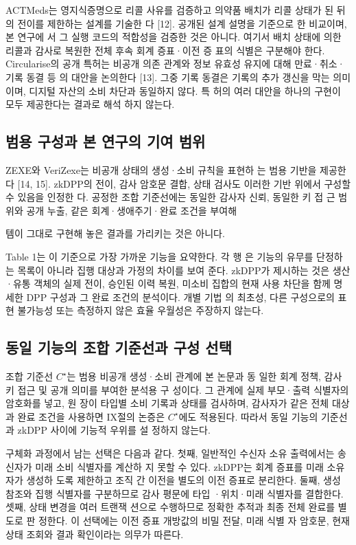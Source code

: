 ACTMeds는 영지식증명으로 리콜 사유를 검증하고 의약품
배치가 리콜 상태가 된 뒤의 전이를 제한하는 설계를 기술한
다 [12]. 공개된 설계 설명을 기준으로 한 비교이며, 본 연구에
서 그 실행 코드의 적합성을 검증한 것은 아니다. 여기서 배치
상태에 의한 리콜과 감사로 복원한 전체 후속 회계 증표·이전 증
표의 식별은 구분해야 한다. Circularise의 공개 특허는 비공개
의존 관계와 정보 유효성 유지에 대해 만료·취소·기록 동결 등
의 대안을 논의한다 [13]. 그중 기록 동결은 기록의 추가 갱신을
막는 의미이며, 디지털 자산의 소비 차단과 동일하지 않다. 특
허의 여러 대안을 하나의 구현이 모두 제공한다는 결과로 해석
하지 않는다.

\subsection{범용 구성과 본 연구의 기여 범위}
ZEXE와 VeriZexe는 비공개 상태의 생성·소비 규칙을 표현하
는 범용 기반을 제공한다 [14, 15]. zkDPP의 전이, 감사 암호문
결합, 상태 검사도 이러한 기반 위에서 구성할 수 있음을 인정한
다. 공정한 조합 기준선에는 동일한 감사자 신뢰, 동일한 키 접
근 범위와 공개 누출, 같은 회계·생애주기·완료 조건을 부여해

템이 그대로 구현해 놓은 결과를 가리키는 것은 아니다.

Table 1는 이 기준으로 가장 가까운 기능을 요약한다. 각 행
은 기능의 유무를 단정하는 목록이 아니라 집행 대상과 가정의
차이를 보여 준다. zkDPP가 제시하는 것은 생산·유통 객체의
실제 전이, 승인된 이력 복원, 미소비 집합의 현재 사용 차단을
함께 명세한 DPP 구성과 그 완료 조건의 분석이다. 개별 기법
의 최초성, 다른 구성으로의 표현 불가능성 또는 측정하지 않은
효율 우월성은 주장하지 않는다.

\subsection{동일 기능의 조합 기준선과 구성 선택}
조합 기준선 \(C^{\star }\)는 범용 비공개 생성·소비 관계에 본 논문과 동
일한 회계 정책, 감사 키 접근 및 공개 의미를 부여한 분석용 구
성이다. 그 관계에 실제 부모·출력 식별자의 암호화를 넣고, 원
장이 타입별 소비 기록과 상태를 검사하며, 감사자가 같은 전체
대상과 완료 조건을 사용하면 IX절의 논증은 \(C^{\star }\)에도 적용된다.
따라서 동일 기능의 기준선과 zkDPP 사이에 기능적 우위를 설
정하지 않는다.

구체화 과정에서 남는 선택은 다음과 같다. 첫째, 일반적인
수신자 소유 출력에서는 송신자가 미래 소비 식별자를 계산하
지 못할 수 있다. zkDPP는 회계 증표를 미래 소유자가 생성하
도록 제한하고 조직 간 이전을 별도의 이전 증표로 분리한다.
둘째, 생성 참조와 집행 식별자를 구분하므로 감사 평문에 타입
·위치·미래 식별자를 결합한다. 셋째, 상태 변경을 여러 트랜잭
션으로 수행하므로 정확한 추적과 최종 전체 완료를 별도로 판
정한다. 이 선택에는 이전 증표 개방값의 비밀 전달, 미래 식별
자 암호문, 현재 상태 조회와 결과 확인이라는 의무가 따른다.

